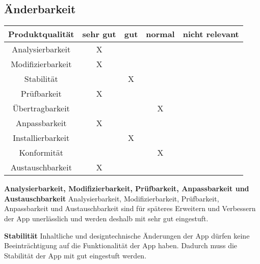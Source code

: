 \documentclass[parskip=full]{scrartcl}
\begin{document}
\subsection{Änderbarkeit}
\begin{tabular}{| c | c | c | c | c |}
    \hline
    \textbf{Produktqualität} & \textbf{sehr gut} & \textbf{gut} & \textbf{normal} & \textbf{nicht relevant} \\ \hline
    Analysierbarkeit         & X                 &              &                 &                         \\ \hline
    Modifizierbarkeit        & X                 &              &                 &                         \\ \hline
    Stabilität               &                   & X            &                 &                         \\ \hline
    Prüfbarkeit              & X                 &              &                 &                         \\ \hline
    Übertragbarkeit          &                   &              & X               &                         \\ \hline
    Anpassbarkeit            & X                 &              &                 &                         \\ \hline
    Installierbarkeit        &                   & X            &                 &                         \\ \hline
    Konformität              &                   &              & X               &                         \\ \hline
    Austauschbarkeit         & X                 &              &                 &                         \\ \hline
\end{tabular}

\textbf{Analysierbarkeit, Modifizierbarkeit, Prüfbarkeit, Anpassbarkeit und Austauschbarkeit} \newline
Analysierbarkeit, Modifizierbarkeit, Prüfbarkeit, Anpassbarkeit und Austauschbarkeit sind für späteres Erweitern und Verbessern der App unerlässlich und werden deshalb mit sehr gut eingestuft.

\textbf{Stabilität}\newline
Inhaltliche und designtechnische Änderungen der App dürfen keine Beeinträchtigung auf die Funktionalität der App haben.
Dadurch muss die Stabilität der App mit gut eingestuft werden.
\end{document}
